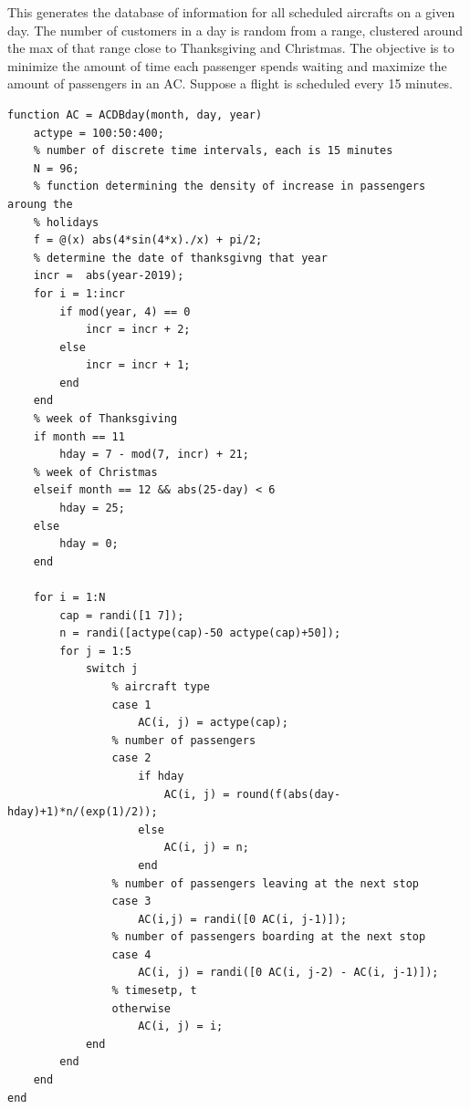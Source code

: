 \documentclass[12pt]{article}
\begin{document}
\begin{par}
This generates the database of information for all scheduled aircrafts on a given day. The number of customers in a day is random from a range, clustered around the max of that range close to Thanksgiving and Christmas. The objective is to minimize the amount of time each passenger spends waiting and maximize the amount of passengers in an AC. Suppose a flight is scheduled every 15 minutes.
\end{par} \vspace{1em}
\begin{verbatim}
function AC = ACDBday(month, day, year)
    actype = 100:50:400;
    % number of discrete time intervals, each is 15 minutes
    N = 96;
    % function determining the density of increase in passengers aroung the
    % holidays
    f = @(x) abs(4*sin(4*x)./x) + pi/2;
    % determine the date of thanksgivng that year
    incr =  abs(year-2019);
    for i = 1:incr
        if mod(year, 4) == 0
            incr = incr + 2;
        else
            incr = incr + 1;
        end
    end
    % week of Thanksgiving
    if month == 11
        hday = 7 - mod(7, incr) + 21;
    % week of Christmas
    elseif month == 12 && abs(25-day) < 6
        hday = 25;
    else
        hday = 0;
    end

    for i = 1:N
        cap = randi([1 7]);
        n = randi([actype(cap)-50 actype(cap)+50]);
        for j = 1:5
            switch j
                % aircraft type
                case 1
                    AC(i, j) = actype(cap);
                % number of passengers
                case 2
                    if hday
                        AC(i, j) = round(f(abs(day-hday)+1)*n/(exp(1)/2));
                    else
                        AC(i, j) = n;
                    end
                % number of passengers leaving at the next stop
                case 3
                    AC(i,j) = randi([0 AC(i, j-1)]);
                % number of passengers boarding at the next stop
                case 4
                    AC(i, j) = randi([0 AC(i, j-2) - AC(i, j-1)]);
                % timesetp, t
                otherwise
                    AC(i, j) = i;
            end
        end
    end
end
\end{verbatim}
\end{document}
